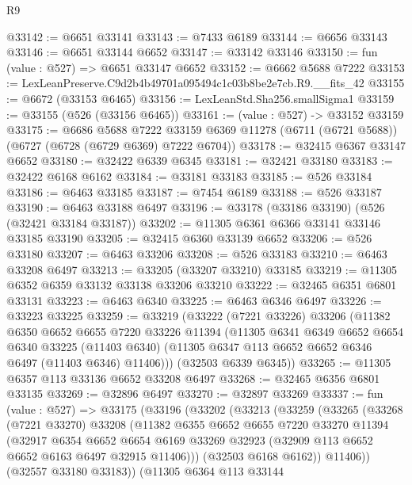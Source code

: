 \begin{lexlean}{R9}
\begin{coremodule}
@33142 := @6651 @33141
@33143 := @7433 @6189
@33144 := @6656 @33143
@33146 := @6651 @33144 @6652
@33147 := @33142 @33146
@33150 := fun (value : @527) => @6651 @33147 @6652
@33152 := @6662 @5688 @7222
@33153 := LexLeanPreserve.C9d2b4b49701a095494c1c03b8be2e7cb.R9.__fits_42
@33155 := @6672 (@33153 @6465)
@33156 := LexLeanStd.Sha256.smallSigma1
@33159 := @33155 (@526 (@33156 @6465))
@33161 := (value : @527) -> @33152 @33159
@33175 := @6686
    @5688
    @7222
    @33159
    @6369
    @11278
    (@6711 (@6721 @5688))
    (@6727 (@6728 (@6729 @6369) @7222 @6704))
@33178 := @32415 @6367 @33147 @6652
@33180 := @32422 @6339 @6345
@33181 := @32421 @33180
@33183 := @32422 @6168 @6162
@33184 := @33181 @33183
@33185 := @526 @33184
@33186 := @6463 @33185
@33187 := @7454 @6189
@33188 := @526 @33187
@33190 := @6463 @33188 @6497
@33196 := @33178 (@33186 @33190) (@526 (@32421 @33184 @33187))
@33202 := @11305 @6361 @6366 @33141 @33146 @33185 @33190
@33205 := @32415 @6360 @33139 @6652
@33206 := @526 @33180
@33207 := @6463 @33206
@33208 := @526 @33183
@33210 := @6463 @33208 @6497
@33213 := @33205 (@33207 @33210) @33185
@33219 := @11305 @6352 @6359 @33132 @33138 @33206 @33210
@33222 := @32465 @6351 @6801 @33131
@33223 := @6463 @6340
@33225 := @6463 @6346 @6497
@33226 := @33223 @33225
@33259 := @33219
    (@33222
      (@7221 @33226)
      @33206
      (@11382
        @6350
        @6652
        @6655
        @7220
        @33226
        @11394
        (@11305
          @6341
          @6349
          @6652
          @6654
          @6340
          @33225
          (@11403 @6340)
          (@11305 @6347 @113 @6652 @6652 @6346 @6497 (@11403 @6346) @11406)))
      (@32503 @6339 @6345))
@33265 := @11305 @6357 @113 @33136 @6652 @33208 @6497
@33268 := @32465 @6356 @6801 @33135
@33269 := @32896 @6497
@33270 := @32897 @33269
@33337 := fun (value : @527) =>
  @33175
    (@33196
      (@33202
        (@33213
          (@33259
            (@33265
              (@33268
                (@7221 @33270)
                @33208
                (@11382
                  @6355
                  @6652
                  @6655
                  @7220
                  @33270
                  @11394
                  (@32917
                    @6354
                    @6652
                    @6654
                    @6169
                    @33269
                    @32923
                    (@32909 @113 @6652 @6652 @6163 @6497 @32915 @11406)))
                (@32503 @6168 @6162))
              @11406))
          (@32557 @33180 @33183))
        (@11305
          @6364
          @113
          @33144

\end{coremodule}
\end{lexlean}
